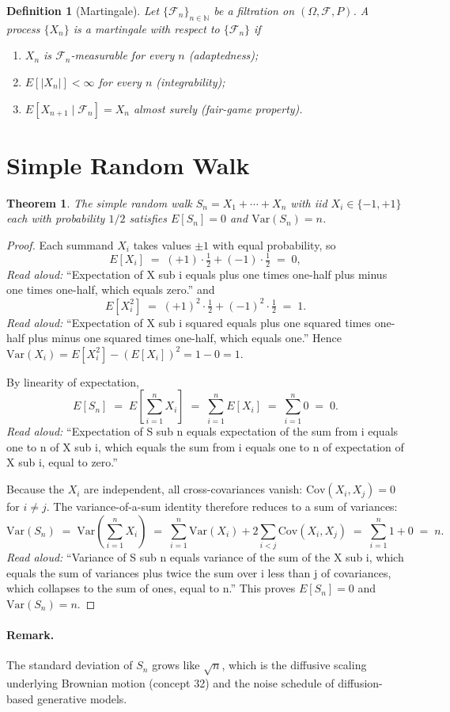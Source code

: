 \documentclass[11pt]{article}
\newtheorem{theorem}{Theorem}
\newtheorem{definition}{Definition}
\begin{document}
\begin{definition}[Martingale]
Let $\{\mathcal{F}_n\}_{n \in \mathbb{N}}$ be a filtration on
$(\Omega, \mathcal{F}, P)$. A process $\{X_n\}$ is a \emph{martingale}
with respect to $\{\mathcal{F}_n\}$ if
\begin{enumerate}
  \item $X_n$ is $\mathcal{F}_n$-measurable for every $n$ (adaptedness);
  \item $E[|X_n|] < \infty$ for every $n$ (integrability);
  \item $E[X_{n+1} \mid \mathcal{F}_n] = X_n$ almost surely (fair-game
    property).
\end{enumerate}
\end{definition}

\section{Simple Random Walk}

\begin{theorem}
The simple random walk $S_n = X_1 + \cdots + X_n$ with iid
$X_i \in \{-1, +1\}$ each with probability $1/2$ satisfies $E[S_n] = 0$
and $\mathrm{Var}(S_n) = n$.
\end{theorem}

\begin{proof}
Each summand $X_i$ takes values $\pm 1$ with equal probability, so
\[
  E[X_i] \;=\; (+1) \cdot \tfrac{1}{2} + (-1) \cdot \tfrac{1}{2} \;=\; 0,
\]
\emph{Read aloud:} ``Expectation of X sub i equals plus one times one-half
plus minus one times one-half, which equals zero.''
and
\[
  E[X_i^2] \;=\; (+1)^2 \cdot \tfrac{1}{2} + (-1)^2 \cdot \tfrac{1}{2} \;=\; 1.
\]
\emph{Read aloud:} ``Expectation of X sub i squared equals plus one squared
times one-half plus minus one squared times one-half, which equals one.''
Hence $\mathrm{Var}(X_i) = E[X_i^2] - (E[X_i])^2 = 1 - 0 = 1$.

By linearity of expectation,
\[
  E[S_n] \;=\; E\!\left[ \sum_{i=1}^{n} X_i \right]
         \;=\; \sum_{i=1}^{n} E[X_i] \;=\; \sum_{i=1}^{n} 0 \;=\; 0.
\]
\emph{Read aloud:} ``Expectation of S sub n equals expectation of the sum
from i equals one to n of X sub i, which equals the sum from i equals one
to n of expectation of X sub i, equal to zero.''

Because the $X_i$ are independent, all cross-covariances vanish:
$\mathrm{Cov}(X_i, X_j) = 0$ for $i \neq j$. The
variance-of-a-sum identity therefore reduces to a sum of variances:
\[
  \mathrm{Var}(S_n)
  \;=\; \mathrm{Var}\!\left( \sum_{i=1}^{n} X_i \right)
  \;=\; \sum_{i=1}^{n} \mathrm{Var}(X_i)
        + 2 \sum_{i < j} \mathrm{Cov}(X_i, X_j)
  \;=\; \sum_{i=1}^{n} 1 + 0
  \;=\; n.
\]
\emph{Read aloud:} ``Variance of S sub n equals variance of the sum of the
X sub i, which equals the sum of variances plus twice the sum over i less
than j of covariances, which collapses to the sum of ones, equal to n.''
This proves $E[S_n] = 0$ and $\mathrm{Var}(S_n) = n$.
\end{proof}

\paragraph{Remark.} The standard deviation of $S_n$ grows like $\sqrt{n}$,
which is the diffusive scaling underlying Brownian motion (concept 32)
and the noise schedule of diffusion-based generative models.
\end{document}
